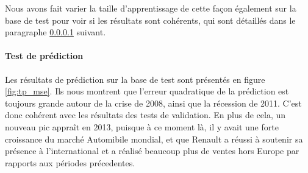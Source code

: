 Nous avons fait varier la taille d'apprentissage de cette façon également sur la base de test pour voir si les résultats sont cohérents, qui sont détaillés dans le paragraphe \ref{sec:tp} suivant.\\



\paragraph{Test de prédiction}\label{sec:tp}

Les résultats de prédiction sur la base de test sont présentés en figure \ref{fig:tp_mse}. Ils nous montrent que l'erreur quadratique de la prédiction est toujours grande autour de la crise de 2008, ainsi que la récession de 2011. C'est donc cohérent avec les résultats des tests de validation. En plus de cela, un nouveau pic appraît en 2013, puisque à ce moment là, il y avait une forte croissance du marché Automibile mondial, et que Renault a réussi à soutenir sa présence à l'international et a réalisé beaucoup plus de ventes hors Europe par rapports aux périodes précedentes.\\


